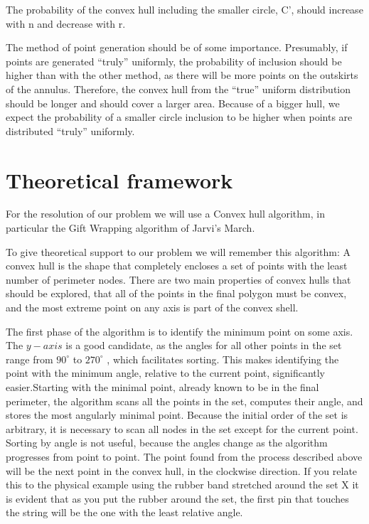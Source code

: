 \documentclass[12pt,a4paper]{article}
\begin{document}
The probability of the convex hull including the smaller circle, C’, should increase with n and decrease with r. \medskip 
 
The method of point generation should be of some importance. Presumably, if points are generated “truly” uniformly, the probability of inclusion should be higher than with the other method, as there will be more points on the outskirts of the annulus. Therefore, the convex hull from the “true” uniform distribution should be longer and should cover a larger area. Because of a bigger hull, we expect the probability of a smaller circle inclusion to be higher when points are distributed “truly” uniformly. 
 
\section*{Theoretical framework}
For the resolution of our problem we will use a Convex hull algorithm, in particular the Gift Wrapping algorithm of Jarvi's March. \medskip

To give theoretical support to our problem we will remember this algorithm:
A convex hull is the shape that completely encloses a set of points with the least number of perimeter nodes.
There are two main properties of convex hulls that should be explored, that all of the points in the final polygon must be convex, and the most extreme point on any axis is part of the convex shell. \medskip

The first phase of the algorithm is to identify the minimum point on some axis. The $ y-axis $ is a good candidate, as the angles for all other points in the set range from $90^{\circ}$  to $270^ {\circ}$ , which facilitates sorting. This makes identifying the point with the minimum angle, relative to the current point, significantly easier.Starting with the minimal point, already known to be in the final perimeter, the algorithm scans all the points in the set, computes their angle, and stores the most angularly minimal point. Because the initial order of the set is arbitrary, it is necessary to scan all nodes in the set except for the current point. Sorting by angle is not useful, because the angles change as the algorithm progresses from point to point. The point found from the process described above will be the next point in the convex hull, in the clockwise direction. If you relate this to the physical example using the rubber band stretched around the set X it is evident that as you put the rubber around the set, the first pin that touches the string will be the one with the least relative angle.\medskip
\end{document}
